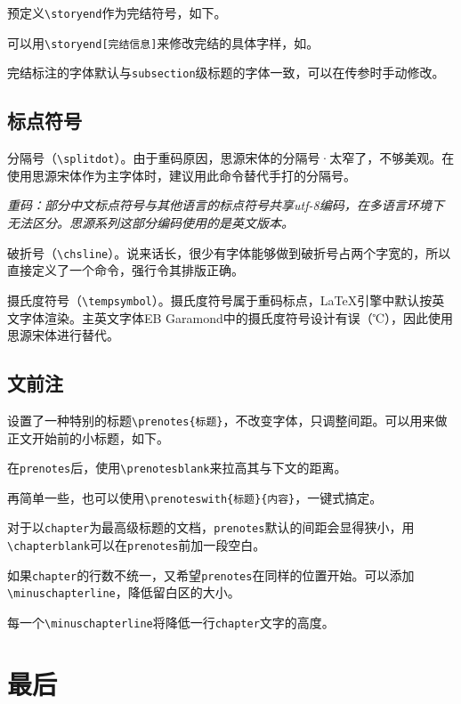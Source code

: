 \documentclass[10pt,openany]{book}
\begin{document}
预定义\verb|\storyend|作为完结符号，如下。

\storyend

可以用\verb|\storyend[完结信息]|来修改完结的具体字样，如。

\storyend[结束End]

完结标注的字体默认与\verb|subsection|级标题的字体一致，可以在传参时手动修改。

\section{标点符号}

分隔号{\splitdot}（\verb|\splitdot|）。由于重码原因，思源宋体的分隔号·太窄了，不够美观。在使用思源宋体作为主字体时，建议用此命令替代手打的分隔号。

\textit{重码：部分中文标点符号与其他语言的标点符号共享utf-8编码，在多语言环境下无法区分。思源系列这部分编码使用的是英文版本。}

{\chsline}破折号（\verb|\chsline|）。说来话长，很少有字体能够做到破折号占两个字宽的，所以直接定义了一个命令，强行令其排版正确。

摄氏度符号{\tempsymbol}（\verb|\tempsymbol|）。摄氏度符号属于重码标点，\LaTeX 引擎中默认按英文字体渲染。主英文字体EB Garamond中的摄氏度符号设计有误（℃），因此使用思源宋体进行替代。

\section{文前注}

设置了一种特别的标题\verb|\prenotes{标题}|，不改变字体，只调整间距。可以用来做正文开始前的小标题，如下。


在\verb|prenotes|后，使用\verb|\prenotesblank|来拉高其与下文的距离。

\prenotesblank

再简单一些，也可以使用\verb|\prenoteswith{标题}{内容}|，一键式搞定。


对于以\verb|chapter|为最高级标题的文档，\verb|prenotes|默认的间距会显得狭小，用\verb|\chapterblank|可以在\verb|prenotes|前加一段空白。

如果\verb|chapter|的行数不统一，又希望\verb|prenotes|在同样的位置开始。可以添加\verb|\minuschapterline|，降低留白区的大小。

每一个\verb|\minuschapterline|将降低一行\verb|chapter|文字的高度。

\chapter{最后}
\end{document}
